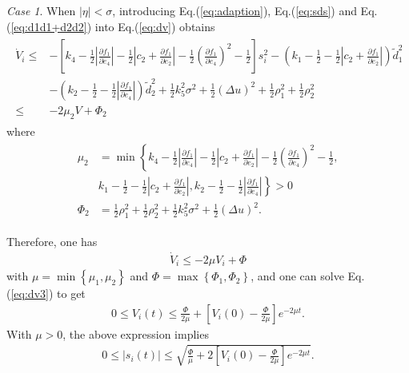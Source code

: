 \documentclass[ShortAfour]{sage}
\theoremstyle{plain}
\theoremstyle{remark}
\newtheorem{mycase}{Case}
\begin{document}
\begin{mycase}
  When $\vert\eta\vert<\sigma$, introducing Eq.(\ref{eq:adaption}), Eq.(\ref{eq:sds}) and Eq.(\ref{eq:d1d1+d2d2}) into Eq.(\ref{eq:dv})  obtains
  \begin{align}\begin{split}
    \dot V_i \le&-\left[k_4-\frac{1}{2}\left\vert\frac{\partial f_1}{\partial e_4}\right\vert-\frac{1}{2}\left\vert c_2+\frac{\partial f_1}{\partial e_2}\right\vert-\frac{1}{2}\left(\frac{\partial f_1}{\partial e_4}\right)^2-\frac{1}{2}\right]s_i^2-\left(k_1-\frac{1}{2}-\frac{1}{2}\left\vert c_2+\frac{\partial f_1}{\partial e_2}\right\vert\right)\tilde{d}_1^2\\
    &-\left(k_2-\frac{1}{2}-\frac{1}{2}\left\vert\frac{\partial f_1}{\partial e_4}\right\vert\right)\tilde{d}_2^2 +\frac{1}{2}k_5^2\sigma^2+\frac{1}{2}(\Delta u)^2+\frac{1}{2}\rho_1^2+\frac{1}{2}\rho_2^2\\
    \le& -2\mu_2V+\Phi_2
  \end{split}\end{align}
  where
  \begin{align}\begin{split}
    \mu_2&=\min\left\{k_4-\frac{1}{2}\left\vert\frac{\partial f_1}{\partial e_4}\right\vert-\frac{1}{2}\left\vert c_2+\frac{\partial f_1}{\partial e_2}\right\vert-\frac{1}{2}\left(\frac{\partial f_1}{\partial e_4}\right)^2-\frac{1}{2},\right.\\
    &\left.k_1-\frac{1}{2}-\frac{1}{2}\left\vert c_2+\frac{\partial f_1}{\partial e_2}\right\vert,k_2-\frac{1}{2}-\frac{1}{2}\left\vert\frac{\partial f_1}{\partial e_4}\right\vert\right\}>0\\
    \Phi_2&=\frac{1}{2}\rho_1^2+\frac{1}{2}\rho_2^2+\frac{1}{2}k_5^2\sigma^2+\frac{1}{2}(\Delta u)^2.\label{eq:dv2}
  \end{split}\end{align}
\end{mycase}
Therefore, one has
\begin{align}
  \dot V_i \le -2\mu V_i+\Phi\label{eq:dv3}
\end{align}
with $\mu =\min\left\{\mu_1,\mu_2\right\}$ and $\Phi =\max\left\{\Phi_1,\Phi_2\right\}$, and one can solve Eq.(\ref{eq:dv3}) to get
\begin{align}
  0\le V_i(t)\le\frac{\Phi}{2\mu}+\left[V_i(0)-\frac{\Phi}{2\mu}\right]e^{-2\mu t}.
\end{align}
With $\mu>0$, the above expression implies
\begin{align}
  0\le\vert s_i(t)\vert\le\sqrt{\frac{\Phi}{\mu}+2\left[V_i(0)-\frac{\Phi}{2\mu}\right]e^{-2\mu t}}\label{eq:abs s}.
\end{align}
\end{document}
